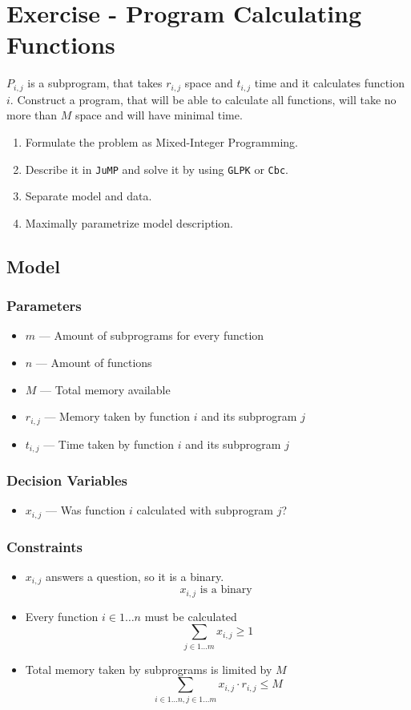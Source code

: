 \section{Exercise - Program Calculating Functions}
$P_{i,j}$ is a subprogram, that takes $r_{i,j}$ space and $t_{i,j}$ time and it calculates function $i$.
Construct a program, that will be able to calculate all functions, will take no more than $M$ space and will have minimal time.

    
\begin{enumerate}
    \item Formulate the problem as Mixed-Integer Programming. \done
    \item Describe it in \texttt{JuMP} and solve it by using \texttt{GLPK} or \texttt{Cbc}. \done
    \item Separate model and data. \done
    \item Maximally parametrize model description. \done
\end{enumerate}

\subsection{Model}
\subsubsection*{Parameters}
\begin{itemize}
    \item $m$ --- Amount of subprograms for every function
    \item $n$ --- Amount of functions
    \item $M$ --- Total memory available
    \item $r_{i,j}$ --- Memory taken by function $i$ and its subprogram $j$
    \item $t_{i,j}$ --- Time taken by function $i$ and its subprogram $j$
\end{itemize}
\subsubsection*{Decision Variables}
\begin{itemize}
    \item $x_{i,j}$ --- Was function $i$ calculated with subprogram $j$?
\end{itemize}
\subsubsection*{Constraints}
\begin{itemize}
    \item $x_{i,j}$ answers a question, so it is a binary.
    $$x_{i,j} \textrm{ is a binary }$$
    \item Every function $i \in 1 \dots n$ must be calculated
    $$\sum_{j \in 1 \dots m} x_{i,j} \geqslant 1$$
    \item Total memory taken by subprograms is limited by $M$
    $$\sum_{i \in 1 \dots n, j \in 1 \dots m}  x_{i,j} \cdot r_{i,j} \leqslant M $$
\end{itemize}
